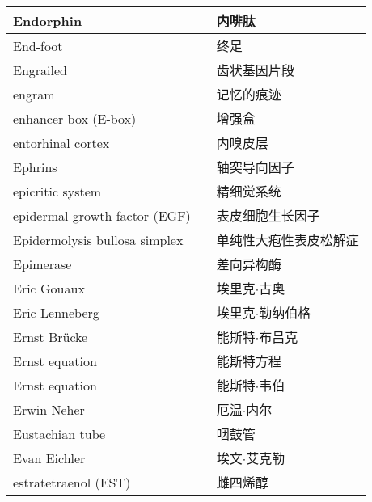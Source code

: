 \begin{longtable}{lll}
	\midrule
	Endorphin     &&  内啡肽  \\
	
	\midrule
	End-foot     &&  终足  \\
	
	\midrule
	Engrailed     &&  齿状基因片段  \\
	
	\midrule
	engram     &&  记忆的痕迹  \\
	
	\midrule
	enhancer box (E-box)    &&  增强盒  \\
	
	\midrule
	entorhinal cortex     &&  内嗅皮层  \\
	
	\midrule
	Ephrins     &&  轴突导向因子  \\
	
	\midrule
	epicritic system     &&  精细觉系统  \\
	
	\midrule
	epidermal growth factor (EGF)    &&  表皮细胞生长因子  \\
	
	\midrule
	Epidermolysis bullosa simplex    &&  单纯性大疱性表皮松解症  \\
	
	\midrule
	Epimerase    &&  差向异构酶  \\
	
	\midrule
	Eric Gouaux    &&  埃里克$\cdot$古奥  \\
	
	\midrule
	Eric Lenneberg    &&  埃里克$\cdot$勒纳伯格  \\
	
	\midrule
	Ernst Brücke    &&  能斯特$\cdot$布吕克  \\
	
	\midrule
	Ernst equation    &&  能斯特方程  \\
	
	\midrule
	Ernst equation    &&  能斯特$\cdot$韦伯  \\
	
	\midrule
	Erwin Neher    &&  厄温$\cdot$内尔  \\
	
	\midrule
	Eustachian tube    &&  咽鼓管  \\
	
	\midrule
	Evan Eichler    &&  埃文$\cdot$艾克勒  \\
	
	\midrule
	estratetraenol (EST)   &&  雌四烯醇  \\
	

\end{longtable}
